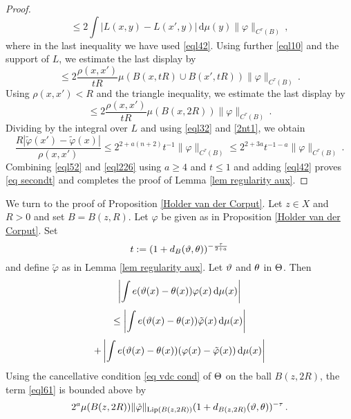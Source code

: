 {\begin{proof}
\begin{equation}
    \le 2  \int |L(x,y)  -L(x',y)|  \, \mathrm{d}\mu(y)
    \|\varphi\|_{C^\tau(B)}\, ,
\end{equation}
where in the last inequality we have used  \eqref{eql42}.
Using further \eqref{eql10} and the support of $L$, we estimate the last display by
\begin{equation}\label{eql224}\le 2  \frac{\rho(x,x')} {tR}\mu(B(x,tR)\cup B(x',tR))
\|\varphi\|_{C^\tau(B)}\, .
    \end{equation}
  Using $\rho(x,x')<R$ and the triangle inequality, we estimate the last display by
\begin{equation}\label{eql225}\le 2
\frac{\rho(x,x')} {tR}
\mu(B(x,2R))
\|\varphi\|_{C^\tau(B)}\, .
    \end{equation}
Dividing by the integral over $L$ and using \eqref{eql32} and \eqref{2nt1}, we obtain
\begin{equation}\label{eql226}
 \frac {R |\tilde{\varphi}(x') - \tilde \varphi(x)|}{\rho(x,x')}
 \le   2^{2+a(n+2)}t^{-1}\|\varphi\|_{C^\tau(B)} \le
 2^{2+3a} t^{-1-a} \|\varphi\|_{C^\tau(B)}\, .
\end{equation}
Combining \eqref{eql52} and  \eqref{eql226} using $a\ge 4$ and $t\le 1$ and
adding \eqref{eql42} proves \eqref{eq secondt} and completes the proof
of Lemma \ref{lem regularity aux}.
\end{proof}


We turn to the proof of Proposition \ref{Holder van der Corput}.
Let $z\in X$ and $R>0$ and set $B=B(z,R)$. Let $\varphi$
be given as in Proposition \ref{Holder van der Corput}.
Set
\begin{equation}\label{eql69}
    t:=(1+d_B(\vartheta,\theta))^{-\frac{\tau}{2+a}}
\end{equation}
and define $\tilde{\varphi}$ as in Lemma \ref{lem regularity aux}. Let $\vartheta$ and $\theta$ in $\Theta$.
Then
   \begin{equation}\label{eql60}
       \left|\int e(\vartheta(x)-{\theta(x)}) \varphi (x)\, \mathrm{d}\mu(x)\right|
   \end{equation}
      \begin{equation}\label{eql61}
   \le     \left|\int e(\vartheta(x)-{\theta(x)}) \tilde{\varphi} (x)\, \mathrm{d}\mu(x)\right|
   \end{equation}
           \begin{equation}\label{eql62}
     +  \left|\int e(\vartheta(x)-{\theta(x)}) (\varphi (x)-\tilde{\varphi}(x))\, \mathrm{d}\mu(x)\right|
   \end{equation}
Using the cancellative condition \eqref{eq vdc cond}  of $\Theta$ on the ball $B(z,2R)$, the term \eqref{eql61} is bounded above by
 \begin{equation}\label{eql63}
       2^a \mu(B(z,2R)) \|\tilde{\varphi}\|_{\operatorname{\operatorname{Lip}}(B(z,2R))} (1 + d_{B(z,2R)}(\vartheta,\theta))^{-\tau}  \, .
 \end{equation}



}
